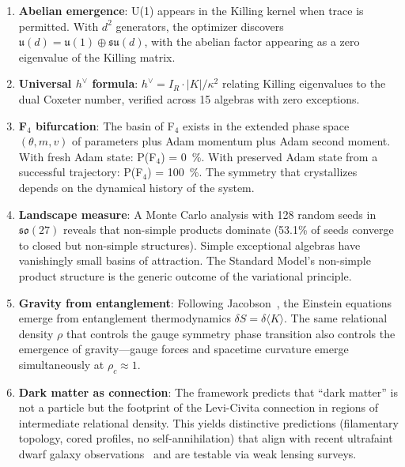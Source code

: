 \begin{enumerate}[label=\arabic*.]
\item \textbf{Abelian emergence}: U(1) appears in the Killing kernel when trace is permitted. With $d^2$ generators, the optimizer discovers $\mathfrak{u}(d) = \mathfrak{u}(1) \oplus \mathfrak{su}(d)$, with the abelian factor appearing as a zero eigenvalue of the Killing matrix.

\item \textbf{Universal $h^\vee$ formula}: $h^\vee = I_R \cdot |K|/\kappa^2$ relating Killing eigenvalues to the dual Coxeter number, verified across 15 algebras with zero exceptions.

\item \textbf{F$_4$ bifurcation}: The basin of F$_4$ exists in the extended phase space $(\theta, m, v)$ of parameters plus Adam momentum plus Adam second moment. With fresh Adam state: P(F$_4$) = \SI{0}{\percent}. With preserved Adam state from a successful trajectory: P(F$_4$) = \SI{100}{\percent}. The symmetry that crystallizes depends on the dynamical history of the system.

\item \textbf{Landscape measure}: A Monte Carlo analysis with 128 random seeds in $\mathfrak{so}(27)$ reveals that non-simple products dominate (53.1\% of seeds converge to closed but non-simple structures). Simple exceptional algebras have vanishingly small basins of attraction. The Standard Model's non-simple product structure is the generic outcome of the variational principle.

\item \textbf{Gravity from entanglement}: Following Jacobson~\cite{Jacobson1995,Jacobson1998}, the Einstein equations emerge from entanglement thermodynamics $\delta S = \delta\langle K \rangle$. The same relational density $\rho$ that controls the gauge symmetry phase transition also controls the emergence of gravity---gauge forces and spacetime curvature emerge simultaneously at $\rho_c \approx 1$.

\item \textbf{Dark matter as connection}: The framework predicts that ``dark matter'' is not a particle but the footprint of the Levi-Civita connection in regions of intermediate relational density. This yields distinctive predictions (filamentary topology, cored profiles, no self-annihilation) that align with recent ultrafaint dwarf galaxy observations~\cite{SanchezAlmeitaTrujilloPlastino2024} and are testable via weak lensing surveys.
\end{enumerate}

